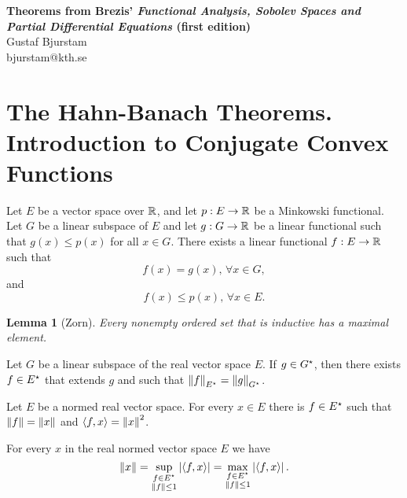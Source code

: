 \documentclass[11pt]{article}
\theoremstyle{plain}
\newtheorem{lemma}{Lemma}[section]
\begin{document}
\begin{center}
\textbf{\large Theorems from Brezis' \textit{Functional Analysis, Sobolev Spaces and Partial Differential Equations} (first edition)} \\
Gustaf Bjurstam\\
bjurstam@kth.se\\
\end{center}

\section{The Hahn-Banach Theorems. Introduction to Conjugate Convex Functions}
\begin{theorem}
    Let $E$ be a vector space over $\mathbb{R}$, and let $p:E\to\mathbb{R}$ be a Minkowski functional. Let $G$ be a linear subspace of $E$ and let $g:G\to \mathbb{R}$ be a linear functional such that $g(x)\leq p(x)$ for all $x\in G$. There exists a linear functional $f:E\to \mathbb{R}$ such that
    \begin{equation*}
        f(x)=g(x),\, \forall x\in G,
    \end{equation*}
    and 
    \begin{equation*}
        f(x)\leq p(x),\, \forall x\in E.
    \end{equation*}
\end{theorem}

\begin{lemma}[Zorn]
    Every nonempty ordered set that is inductive has a maximal element.
\end{lemma}

\begin{corollary}
    Let $G$ be a linear subspace of the real vector space $E$. If $g\in G{}^{\star}$, then there exists $f\in E{}^{\star}$ that extends $g$ and such that $\left\lVert f\right\rVert_{E{}^{\star}} = \left\lVert g\right\rVert_{G{}^{\star}}$.
\end{corollary}

\begin{corollary}
    Let $E$ be a normed real vector space. For every $x\in E$ there is $f\in E{}^{\star}$ such that $\left\lVert f\right\rVert = \left\lVert x\right\rVert$ and $\left\langle f, x\right\rangle = \left\lVert x\right\rVert^2$.
\end{corollary}

\begin{corollary}
    For every $x$ in the real normed vector space $E$ we have
    \begin{equation*}
        \left\lVert x\right\rVert = \sup_{\substack{f\in E{}^{\star} \\ \left\lVert f\right\rVert\leq 1}} \left|\left\langle f, x\right\rangle\right| = \max_{\substack{f\in E{}^{\star} \\ \left\lVert f\right\rVert\leq 1}} \left|\left\langle f, x\right\rangle\right|.
    \end{equation*}
\end{corollary}
\end{document}
